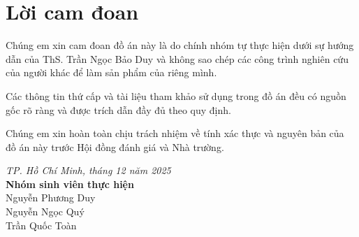 \section*{Lời cam đoan}
\thispagestyle{empty}

Chúng em xin cam đoan đồ án này là do chính nhóm tự thực hiện dưới sự hướng dẫn của ThS. Trần Ngọc Bảo Duy và không sao chép các công trình nghiên cứu của người khác để làm sản phẩm của riêng mình. 

Các thông tin thứ cấp và tài liệu tham khảo sử dụng trong đồ án đều có nguồn gốc rõ ràng và được trích dẫn đầy đủ theo quy định. 

Chúng em xin hoàn toàn chịu trách nhiệm về tính xác thực và nguyên bản của đồ án này trước Hội đồng đánh giá và Nhà trường.

\vspace{2cm}

\begin{flushright}
    \textit{TP. Hồ Chí Minh, tháng 12 năm 2025} \\
    \textbf{Nhóm sinh viên thực hiện} \\
    \vspace{2.5cm} 
    Nguyễn Phương Duy \\
    Nguyễn Ngọc Quý \\
    Trần Quốc Toàn \\
\end{flushright}

\clearpage